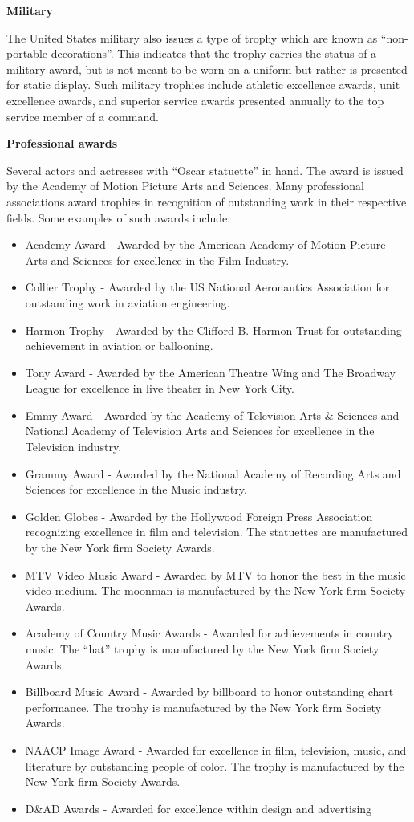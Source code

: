 \documentclass[
  openany]{book}
\providecommand{\tightlist}{%
  \setlength{\itemsep}{0pt}\setlength{\parskip}{0pt}}
\begin{document}
\textbf{Military}

The United States military also issues a type of trophy which are known as ``non-portable decorations''. This indicates that the trophy carries the status of a military award, but is not meant to be worn on a uniform but rather is presented for static display. Such military trophies include athletic excellence awards, unit excellence awards, and superior service awards presented annually to the top service member of a command.

\textbf{Professional awards}

Several actors and actresses with ``Oscar statuette'' in hand. The award is issued by the Academy of Motion Picture Arts and Sciences.
Many professional associations award trophies in recognition of outstanding work in their respective fields. Some examples of such awards include:

\begin{itemize}
\tightlist
\item
  Academy Award - Awarded by the American Academy of Motion Picture Arts and Sciences for excellence in the Film Industry.
\item
  Collier Trophy - Awarded by the US National Aeronautics Association for outstanding work in aviation engineering.
\item
  Harmon Trophy - Awarded by the Clifford B. Harmon Trust for outstanding achievement in aviation or ballooning.
\item
  Tony Award - Awarded by the American Theatre Wing and The Broadway League for excellence in live theater in New York City.
\item
  Emmy Award - Awarded by the Academy of Television Arts \& Sciences and National Academy of Television Arts and Sciences for excellence in the Television industry.
\item
  Grammy Award - Awarded by the National Academy of Recording Arts and Sciences for excellence in the Music industry.
\item
  Golden Globes - Awarded by the Hollywood Foreign Press Association recognizing excellence in film and television. The statuettes are manufactured by the New York firm Society Awards.
\item
  MTV Video Music Award - Awarded by MTV to honor the best in the music video medium. The moonman is manufactured by the New York firm Society Awards.
\item
  Academy of Country Music Awards - Awarded for achievements in country music. The ``hat'' trophy is manufactured by the New York firm Society Awards.
\item
  Billboard Music Award - Awarded by billboard to honor outstanding chart performance. The trophy is manufactured by the New York firm Society Awards.
\item
  NAACP Image Award - Awarded for excellence in film, television, music, and literature by outstanding people of color. The trophy is manufactured by the New York firm Society Awards.
\item
  D\&AD Awards - Awarded for excellence within design and advertising
\end{itemize}
\end{document}
